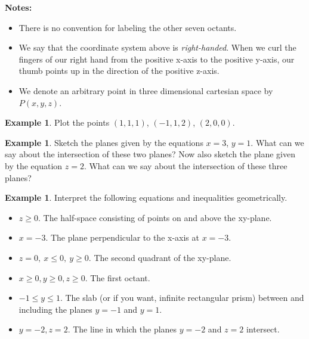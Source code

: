 \documentclass[12pt, letter]{article}
\theoremstyle{plain}
\numberwithin{theorem}{section}
\theoremstyle{definition}
\newtheorem{example}[theorem]{Example}
\begin{document}
\bigskip

\textbf{Notes:}
\begin{itemize}
\item There is no convention for labeling the other seven octants.
\item We say that the coordinate system above is \textit{right-handed}. When we curl the fingers of our right hand from the positive x-axis to the positive y-axis, our thumb points up in the direction of the positive z-axis.
\item We denote an arbitrary point in three dimensional cartesian space by $P(x,y,z)$.
\end{itemize}

\bigskip

\hrulefill

\bigskip

\begin{example}
Plot the points $(1,1,1)$, $(-1,1,2)$, $(2,0,0)$.
\end{example}

\bigskip

\hrulefill

\bigskip

\begin{example}
Sketch the planes given by the equations $x=3$, $y=1$. What can we say about the intersection of these two planes? Now also sketch the plane given by the equation $z=2$. What can we say about the intersection of these three planes?
\end{example}

\bigskip

\hrulefill

\bigskip

\begin{example}
Interpret the following equations and inequalities geometrically.
\begin{itemize}
\item $z \geq 0$. The half-space consisting of points on and above the xy-plane.
\item $x=-3$. The plane perpendicular to the x-axis at $x=-3$.
\item $z=0, \ x\leq 0, \ y \geq 0$. The second quadrant of the xy-plane.
\item $x \geq 0, y \geq 0, z \geq 0$. The first octant.
\item $-1 \leq y \leq 1$. The slab (or if you want, infinite rectangular prism) between and including the planes $y=-1$ and $y=1$.
\item $y=-2, z=2$. The line in which the planes $y=-2$ and $z=2$ intersect.
\end{itemize}
\end{example}
\end{document}
